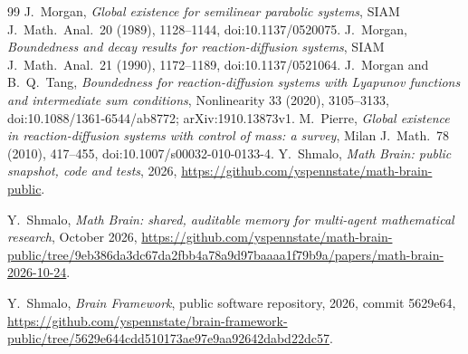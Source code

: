 \documentclass[11pt]{amsart}
\theoremstyle{definition}
\numberwithin{equation}{section}
\begin{document}
\begin{thebibliography}{99}
 J.~Morgan, \emph{Global existence for semilinear parabolic systems}, SIAM J.\ Math.\ Anal.\ 20 (1989), 1128--1144, doi:10.1137/0520075.
 J.~Morgan, \emph{Boundedness and decay results for reaction-diffusion systems}, SIAM J.\ Math.\ Anal.\ 21 (1990), 1172--1189, doi:10.1137/0521064.
 J.~Morgan and B.~Q.~Tang, \emph{Boundedness for reaction-diffusion systems with Lyapunov functions and intermediate sum conditions}, Nonlinearity 33 (2020), 3105--3133, doi:10.1088/1361-6544/ab8772; arXiv:1910.13873v1.
 M.~Pierre, \emph{Global existence in reaction-diffusion systems with control of mass: a survey}, Milan J.\ Math.\ 78 (2010), 417--455, doi:10.1007/s00032-010-0133-4.
 Y.~Shmalo, \emph{Math Brain: public snapshot, code and tests}, 2026, \url{https://github.com/yspennstate/math-brain-public}.

 Y.~Shmalo, \emph{Math Brain: shared, auditable memory for multi-agent mathematical research}, October 2026, \url{https://github.com/yspennstate/math-brain-public/tree/9eb386da3dc67da2fbb4a78a9d97baaaa1f79b9a/papers/math-brain-2026-10-24}.

 Y.~Shmalo, \emph{Brain Framework}, public software repository, 2026, commit 5629e64, \url{https://github.com/yspennstate/brain-framework-public/tree/5629e644cdd510173ae97e9aa92642dabd22dc57}.

\end{thebibliography}
\end{document}
